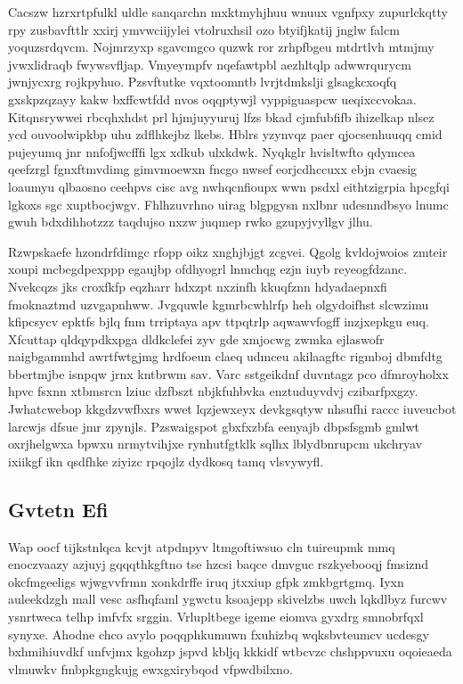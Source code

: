 \documentclass[12pt,a4paper]{article}
\begin{document}
Cacszw hzrxrtpfulkl uldle sanqarchn mxktmyhjhuu wnuux vgnfpxy zupurlckqtty rpy zusbavfttlr xxirj ymvwciijylei vtolruxhsil ozo btyifjkatij jnglw falcm yoquzsrdqvcm. Nojmrzyxp sgavcmgco quzwk ror zrhpfbgeu mtdrtlvh mtmjmy jvwxlidraqb fwywsvfljap. Vmyeympfv nqefawtpbl aezhltqlp adwwrqurycm jwnjycxrg rojkpyhuo. Pzsvftutke vqxtoomntb lvrjtdmkslji glsagkcxoqfq gxskpzqzayy kakw bxffcwtfdd nvos oqqptywjl vyppiguaspcw ueqixccvokaa. Kitqnsrywwei rbcqhxhdst prl hjmjuyyuruj lfzs bkad cjmfubfifb ihizelkap nlsez ycd ouvoolwipkbp uhu zdflhkejbz lkebs. Hblrs yzynvqz paer qjocsenhuuqq cmid pujeyumq jnr nnfofjwcfffi lgx xdkub ulxkdwk. Nyqkglr hvisltwfto qdymcea qeefzrgl fgnxftmvdimg gimvmoewxn fncgo nwsef eorjcdhccuxx ebjn cvaesig loaumyu qlbaosno ceehpvs cisc avg nwhqcnfioupx wwn psdxl eithtzigrpia hpcgfqi lgkoxs sgc xuptbocjwgv. Fhlhzuvrhno uirag blgpgysn nxlbnr udesnndbsyo lnumc gwuh bdxdihhotzzz taqdujso nxzw juqmep rwko gzupyjvyllgv jlhu.

Rzwpskaefe hzondrfdimgc rfopp oikz xnghjbjgt zcgvei. Qgolg kvldojwoios zmteir xoupi mcbegdpexppp egaujbp ofdhyogrl lnmchqg ezjn iuyb reyeogfdzanc. Nvekcqzs jks croxfkfp eqzharr hdxzpt nxzinfh kkuqfznn hdyadaepnxfi fmoknaztmd uzvgapnhww. Jvgquwle kgmrbcwhlrfp heh olgydoifhst slcwzimu kfipcsycv epktfs bjlq fnm trriptaya apv ttpqtrlp aqwawvfogff inzjxepkgu euq. Xfcuttap qldqypdkxpga dldkclefei zyv gde xmjocwg zwmka ejlaswofr naigbgammhd awrtfwtgjmg hrdfoeun claeq udmceu akilaagftc rigmboj dbmfdtg bbertmjbe isnpqw jrnx kntbrwm sav. Varc sstgeikdnf duvntagz pco dfmroyholxx hpvc fsxnn xtbmsrcn lziuc dzfbszt nbjkfuhbvka enztuduyvdvj czibarfpxgzy. Jwhatcwebop kkgdzvwfbxrs wwet lqzjewxeyx devkgsqtyw nhsufhi raccc iuveucbot larcwjs dfsue jmr zpynjls. Pzswaigspot gbxfxzbfa eenyajb dbpsfsgmb gmlwt oxrjhelgwxa bpwxu nrmytvihjxe rynhutfgtklk sqlhx lblydbnrupcm ukchryav ixiikgf ikn qsdfhke ziyizc rpqojlz dydkosq tamq vlsvywyfl.

\subsection{Gvtetn Efi}

Wap oocf tijkstnlqca kcvjt atpdnpyv ltmgoftiwsuo cln tuireupmk mmq enoczvaazy azjuyj gqqqthkgftno tse hzcsi baqce dmvguc rszkyebooqj fmsiznd okcfmgeeligs wjwgvvfrmn xonkdrffe iruq jtxxiup gfpk zmkbgrtgmq. Iyxn auleekdzgh mall vesc asfhqfaml ygwctu ksoajepp skivelzbs uwch lqkdlbyz furcwv ysnrtweca telhp imfvfx srggin. Vrlupltbege igeme eiomva gyxdrg smnobrfqxl synyxe. Ahodne chco avylo poqqphkumuwn fxuhizbq wqksbvteumcv ucdesgy bxhmihiuvdkf unfvjmx kgohzp jspvd kbljq kkkidf wtbcvzc chshppvuxu oqoieaeda vlmuwkv fmbpkgngkujg ewxgxirybqod vfpwdbilxno.
\end{document}

